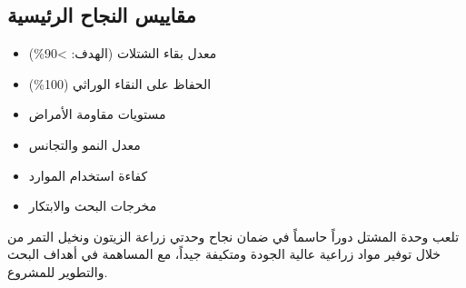 \subsection{مقاييس النجاح الرئيسية}
\begin{itemize}
    \item معدل بقاء الشتلات (الهدف: >90\%)
    \item الحفاظ على النقاء الوراثي (100\%)
    \item مستويات مقاومة الأمراض
    \item معدل النمو والتجانس
    \item كفاءة استخدام الموارد
    \item مخرجات البحث والابتكار
\end{itemize}

تلعب وحدة المشتل دوراً حاسماً في ضمان نجاح وحدتي زراعة الزيتون ونخيل التمر من خلال توفير مواد زراعية عالية الجودة ومتكيفة جيداً، مع المساهمة في أهداف البحث والتطوير للمشروع. 